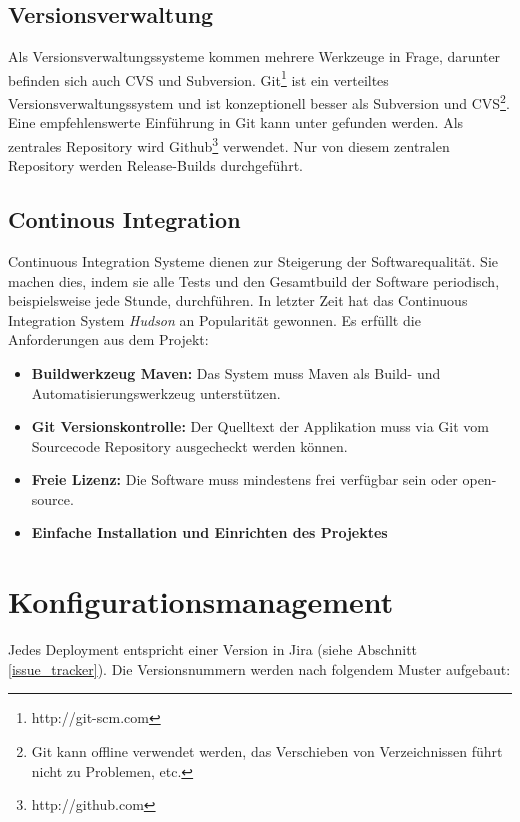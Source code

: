 \subsection{Versionsverwaltung}
Als Versionsverwaltungssysteme kommen mehrere Werkzeuge in Frage, darunter befinden sich auch CVS und Subversion. Git\footnote{http://git-scm.com} ist ein verteiltes Versionsverwaltungssystem und ist konzeptionell besser als Subversion und CVS\footnote{Git kann offline verwendet werden, das Verschieben von Verzeichnissen führt nicht zu Problemen, etc.}. Eine empfehlenswerte Einführung in Git kann unter \cite{dilger201111}  gefunden werden. Als zentrales Repository wird Github\footnote{http://github.com} verwendet. Nur von diesem zentralen Repository werden Release-Builds durchgeführt.




\subsection{Continous Integration}
Continuous Integration Systeme dienen zur Steigerung der Softwarequalität. Sie machen dies, indem sie alle Tests und den Gesamtbuild der Software periodisch, beispielsweise jede Stunde, durchführen. In letzter Zeit hat das Continuous Integration System \textit{Hudson} an Popularität gewonnen. Es erfüllt die Anforderungen aus dem Projekt:
\begin{itemize}
	\item \textbf{Buildwerkzeug Maven:} Das System muss Maven als Build- und Automatisierungswerkzeug unterstützen.
	\item \textbf{Git Versionskontrolle:} Der Quelltext der Applikation muss via Git vom Sourcecode Repository ausgecheckt werden können.
	\item \textbf{Freie Lizenz:} Die Software muss mindestens frei verfügbar sein oder open-source.
	\item \textbf{Einfache Installation und Einrichten des Projektes}
\end{itemize}

\section{Konfigurationsmanagement}
Jedes Deployment entspricht einer Version in Jira (siehe Abschnitt \ref{issue_tracker}).
Die Versionsnummern werden nach folgendem Muster aufgebaut:\begin{center}
\end{center}

